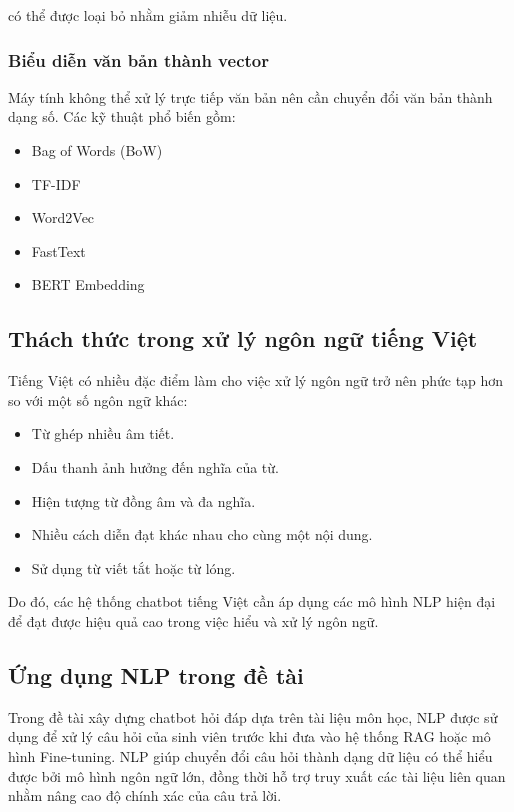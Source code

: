 \documentclass[12pt,a4paper]{report}
\begin{document}
	có thể được loại bỏ nhằm giảm nhiễu dữ liệu.
	
	\subsubsection{Biểu diễn văn bản thành vector}
	
	Máy tính không thể xử lý trực tiếp văn bản nên cần chuyển đổi văn bản thành dạng số. Các kỹ thuật phổ biến gồm:
	
	\begin{itemize}
		\item Bag of Words (BoW)
		\item TF-IDF
		\item Word2Vec
		\item FastText
		\item BERT Embedding
	\end{itemize}
	
	\subsection{Thách thức trong xử lý ngôn ngữ tiếng Việt}
	
	Tiếng Việt có nhiều đặc điểm làm cho việc xử lý ngôn ngữ trở nên phức tạp hơn so với một số ngôn ngữ khác:
	
	\begin{itemize}
		\item Từ ghép nhiều âm tiết.
		\item Dấu thanh ảnh hưởng đến nghĩa của từ.
		\item Hiện tượng từ đồng âm và đa nghĩa.
		\item Nhiều cách diễn đạt khác nhau cho cùng một nội dung.
		\item Sử dụng từ viết tắt hoặc từ lóng.
	\end{itemize}
	
	Do đó, các hệ thống chatbot tiếng Việt cần áp dụng các mô hình NLP hiện đại để đạt được hiệu quả cao trong việc hiểu và xử lý ngôn ngữ.
	
	\subsection{Ứng dụng NLP trong đề tài}
	
	Trong đề tài xây dựng chatbot hỏi đáp dựa trên tài liệu môn học, NLP được sử dụng để xử lý câu hỏi của sinh viên trước khi đưa vào hệ thống RAG hoặc mô hình Fine-tuning. NLP giúp chuyển đổi câu hỏi thành dạng dữ liệu có thể hiểu được bởi mô hình ngôn ngữ lớn, đồng thời hỗ trợ truy xuất các tài liệu liên quan nhằm nâng cao độ chính xác của câu trả lời.
	
\end{document}
